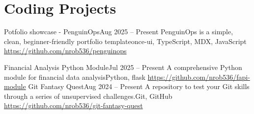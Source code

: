 \section{Coding Projects}
\resumeSubHeadingList
\resumeSubheading
      {Potfolio showcase - PenguinOps}{Aug 2025 -- Present} 
      {PenguinOps is a simple, clean, beginner-friendly portfolio template}{once-ui, TypeScript, MDX, JavaScript}
      {\href{https://github.com/nrob536/penguinops}{https://github.com/nrob536/penguinops}}
      \resumeSubHeadingList
      \resumeSubHeadingListEnd

      \resumeSubheading
      {Financial Analysis Python Module}{Jul 2025 -- Present} 
      {A comprehensive Python module for financial data analysis}{Python, flask}
      {\href{https://github.com/nrob536/fapi-module}{https://github.com/nrob536/fapi-module}}
      \resumeSubHeadingList
      \resumeSubHeadingListEnd
  \resumeSubheading
      {Git Fantasy Quest}{Aug 2024 -- Present}
      {A repository to test your Git skills through a series of unsupervised challenges.}{Git, GitHub}
      {\href{https://github.com/nrob536/git-fantasy-quest}{https://github.com/nrob536/git-fantasy-quest}}
      \resumeSubHeadingList
      \resumeSubHeadingListEnd  
\resumeSubHeadingListEnd